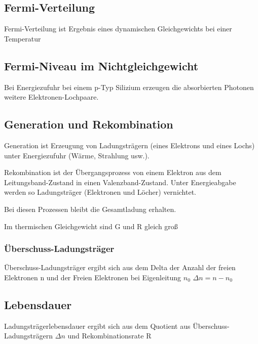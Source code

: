 \subsection{Fermi-Verteilung}
Fermi-Verteilung ist Ergebnis eines dynamischen Gleichgewichts bei einer Temperatur
\subsection{Fermi-Niveau im Nichtgleichgewicht}

Bei Energiezufuhr bei einem p-Typ Silizium erzeugen die absorbierten Photonen weitere Elektronen-Lochpaare. 

	
\subsection{Generation und Rekombination}
	Generation ist Erzeugung von Ladungsträgern (eines Elektrons und eines Lochs) unter Energiezufuhr (Wärme, Strahlung usw.).
	\newline
	
	Rekombination ist der Übergangsprozess von einem Elektron aus dem Leitungsband-Zustand in einen Valenzband-Zustand. Unter Energieabgabe werden so Ladungsträger
	(Elektronen und Löcher) vernichtet.
	\newline
	
	Bei diesen Prozessen bleibt die Gesamtladung erhalten.
	\newline
	
	Im thermischen Gleichgewicht sind G und R gleich groß
	\newline
		
	\subsubsection{Überschuss-Ladungsträger}
	
	Überschuss-Ladungsträger ergibt sich aus dem Delta der Anzahl der freien Elektronen n und der Freien Elektronen bei Eigenleitung $n_0$
	\newline
	$\Delta n=n - n_0$
	
	\subsection{Lebensdauer}
	Ladungsträgerlebensdauer ergibt sich aus dem Quotient aus Überschuss-Ladungsträgern $\Delta n$ und Rekombinationsrate R
	\newline
	
